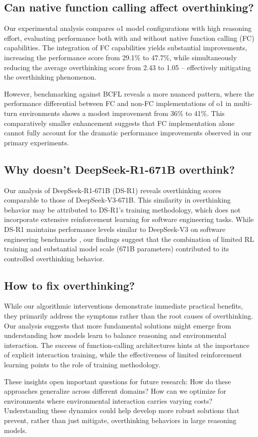 
\subsection{Can native function calling affect overthinking?}

Our experimental analysis compares o1 model configurations with high reasoning effort, evaluating performance both with and without native function calling (FC) capabilities. The integration of FC capabilities yields substantial improvements, increasing the performance score from 29.1\% to 47.7\%, while simultaneously reducing the average overthinking score from 2.43 to 1.05 -- effectively mitigating the overthinking phenomenon.

However, benchmarking against BCFL \cite{berkeley-function-calling-leaderboard} reveals a more nuanced pattern, where the performance differential between FC and non-FC implementations of o1 in multi-turn environments shows a modest improvement from 36\% to 41\%. This comparatively smaller enhancement suggests that FC implementation alone cannot fully account for the dramatic performance improvements observed in our primary experiments.

\subsection{Why doesn't DeepSeek-R1-671B overthink?}
Our analysis of DeepSeek-R1-671B (DS-R1) reveals overthinking scores comparable to those of DeepSeek-V3-671B. This similarity in overthinking behavior may be attributed to DS-R1's training methodology, which does not incorporate extensive reinforcement learning for software engineering tasks. While DS-R1 maintains performance levels similar to DeepSeek-V3 on software engineering benchmarks \cite{deepseekai2025deepseekr1incentivizingreasoningcapability}, our findings suggest that the combination of limited RL training and substantial model scale (671B parameters) contributed to its controlled overthinking behavior.


\subsection{How to fix overthinking?}
\label{fixoverthinking}
While our algorithmic interventions demonstrate immediate practical benefits, they primarily address the symptoms rather than the root causes of overthinking. Our analysis suggests that more fundamental solutions might emerge from understanding how models learn to balance reasoning and environmental interaction. The success of function-calling architectures hints at the importance of explicit interaction training, while the effectiveness of limited reinforcement learning points to the role of training methodology.

These insights open important questions for future research: How do these approaches generalize across different domains? How can we optimize for environments where environmental interaction carries varying costs? Understanding these dynamics could help develop more robust solutions that prevent, rather than just mitigate, overthinking behaviors in large reasoning models.

